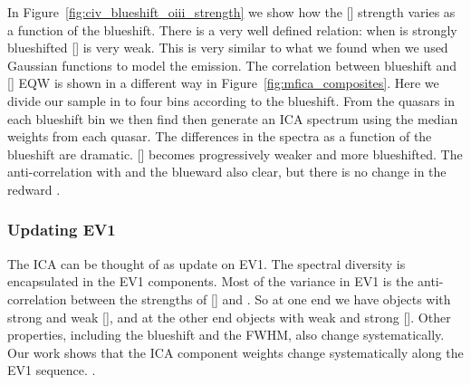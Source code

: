 In Figure~\ref{fig:civ_blueshift_oiii_strength} we show how the [] strength varies as a function of the  blueshift. 
There is a very well defined relation: when  is strongly blueshifted [] is very weak. 
This is very similar to what we found when we used Gaussian functions to model the emission. 
The correlation between  blueshift and [] EQW is shown in a different way in Figure~\ref{fig:mfica_composites}. 
Here we divide our sample in to four bins according to the  blueshift. 
From the quasars in each  blueshift bin we then find then generate an \ac{ICA} spectrum using the median weights from each quasar. 
The differences in the spectra as a function of the  blueshift are dramatic. 
[] becomes progressively weaker and more blueshifted.
The anti-correlation with  and the blueward  also clear, but there is no change in the redward . 

\subsubsection{Updating \ac{EV1}}

The \ac{ICA} can be thought of as update on \ac{EV1}. 
The spectral diversity is encapsulated in the \ac{EV1} components. 
Most of the variance in \ac{EV1} is the anti-correlation between the strengths of [] and . 
So at one end we have objects with strong  and weak [], and at the other end objects with weak  and strong []. 
Other properties, including the  blueshift and the \hb FWHM, also change systematically. 
Our work shows that the \ac{ICA} component weights change systematically along the \ac{EV1} sequence. 
. 